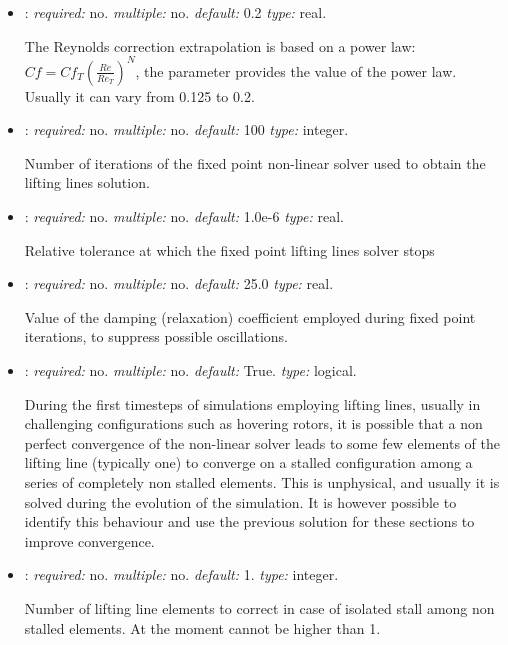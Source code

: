\begin{itemize}
\item {}: \textit{required:} no. \textit{multiple:} no. \textit{default:} 0.2 \textit{type:} real.

The Reynolds correction extrapolation is based on a power law: $Cf = Cf_T \left(\frac{Re}{Re_T}\right)^N$, the parameter provides the value of the power law. Usually it can vary from 0.125 to 0.2.

\item {}: \textit{required:} no. \textit{multiple:} no. \textit{default:} 100 \textit{type:} integer.

Number of iterations of the fixed point non-linear solver used to obtain the lifting lines solution.

\item {}: \textit{required:} no. \textit{multiple:} no. \textit{default:} 1.0e-6 \textit{type:} real.

Relative tolerance at which the fixed point lifting lines solver stops

\item {}: \textit{required:} no. \textit{multiple:} no. \textit{default:} 25.0 \textit{type:} real.

Value of the damping (relaxation) coefficient employed during fixed point iterations, to suppress possible oscillations.

\item {}: \textit{required:} no. \textit{multiple:} no. \textit{default:} True. \textit{type:} logical.

During the first timesteps of simulations employing lifting lines, usually in challenging configurations such as hovering rotors, it is possible that a non perfect convergence of the non-linear solver leads to some few elements of the lifting line (typically one) to converge on a stalled configuration among a series of completely non stalled elements. This is unphysical, and usually it is solved during the evolution of the simulation. It is however possible to identify this behaviour and use the previous solution for these sections to improve convergence. 

\item {}: \textit{required:} no. \textit{multiple:} no. \textit{default:} 1. \textit{type:} integer.

Number of lifting line elements to correct in case of isolated stall among non stalled elements. At the moment cannot be higher than 1.


\end{itemize}
